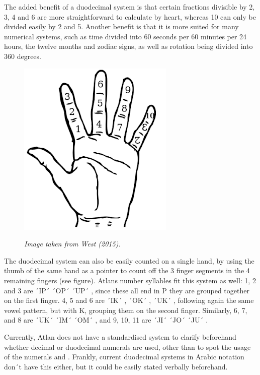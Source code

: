 The added benefit of a duodecimal system is that certain fractions divisible by 2, 3, 4 and 6 are more straightforward to calculate by heart, whereas 10 can only be divided easily by 2 and 5. Another benefit is that it is more suited for many numerical systems, such as time divided into 60 seconds per 60 minutes per 24 hours, the twelve months and zodiac signs, as well as rotation being divided into 360 degrees.  

\pagebreak
\begin{figure}
\includegraphics[scale=0.4]{./Images/Hand.jpeg}

	{\it \footnotesize Image taken from West (2015). }
\end{figure}

The duodecimal system can also be easily counted on a single hand, by using the thumb of the same hand as a pointer to count off the 3 finger segments in the 4 remaining fingers (see figure). Atlans number syllables fit this system as well: 1, 2 and 3 are ´IP´ \ip ´OP´ \op ´UP´ \up, since these all end in P they are grouped together on the first finger. 4, 5 and 6 are ´IK´ \raisebox{-0.5em}{\ik} , ´OK´ \raisebox{-0.5em}{\ok}, ´UK´ \raisebox{-0.5em}{\uk}, following again the same vowel pattern, but with K, grouping them on the second finger. Similarly, 6, 7, and 8 are ´UK´ \uk ´IM´ \im ´OM´ \om, and 9, 10, 11 are ´JI´ \ji ´JO´ \jo ´JU´ \ju. 

Currently, Atlan does not have a standardised system to clarify beforehand whether decimal or duodecimal numerals are used, other than to spot the usage of the numerals  and . Frankly, current duodecimal systems in Arabic notation don´t have this either, but it could be easily stated verbally beforehand.  

